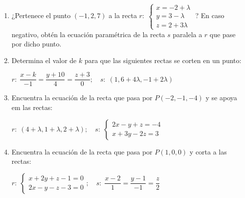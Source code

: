 \begin{enumerate}
\item ¿Pertenece el punto $(-1,2,7)$ a la recta \footnotesize{$r:\; \begin{cases} x=-2+\lambda\\y=3-\lambda\\z=2+3\lambda \end{cases}$} \normalsize{?} En caso negativo, obtén la ecuación paramétrica de la recta $s$ paralela a $r$ que pase por dicho punto.

\vspace{2mm} 

\item Determina el valor de $k$ para que las siguientes rectas se corten en un punto:

$r:\; \dfrac{x-k}{-1}=\dfrac{y+10}{4}=\dfrac{z+3}{0}; \quad s:\; (1,6+4\lambda,-1+2\lambda)$

\vspace{2mm} 

\item Encuentra la ecuación de la recta que pasa por $P(-2,-1,-4)$ y se apoya em las rectas:

$r:\; (4+\lambda, 1+\lambda, 2+\lambda); \quad s:\; \begin{cases} 2x-y+z=-4\\x+3y-2z=3 \end{cases}$

\vspace{2mm} 


\item Encuentra la ecuación de la recta que pasa por $P(1,0,0)$ y corta a las rectas:

$r:\; \begin{cases} x+2y+z-1=0\\2x-y-z-3=0 \end{cases}; \quad s:\; \dfrac{x-2}{1}=\dfrac{y-1}{-1}=\dfrac{z}{2}$

\vspace{2mm} 



\end{enumerate}
